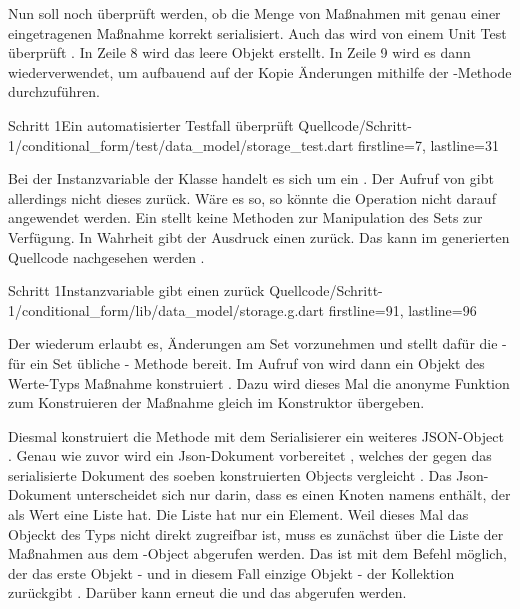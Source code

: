 Nun soll noch überprüft werden, ob die Menge von Maßnahmen mit genau einer eingetragenen Maßnahme korrekt serialisiert. Auch das wird von einem Unit Test überprüft \Lst{\ref{lst:Schritt1MaßnahmenSerialisierenOhneFehlerUnitTest}}. In Zeile 8 wird das leere Objekt  erstellt. In Zeile 9 wird es dann wiederverwendet, um aufbauend auf der Kopie Änderungen mithilfe der -Methode durchzuführen.

\begin{alexlisting}{Schritt 1}{Ein automatisierter Testfall überprüft}
  {Quellcode/Schritt-1/conditional_form/test/data_model/storage_test.dart}
  {firstline=7, lastline=31}
  \label{lst:Schritt1MaßnahmenSerialisierenOhneFehlerUnitTest}
\end{alexlisting}

Bei der Instanzvariable  der Klasse  handelt es sich um ein .  Der Aufruf von   gibt allerdings nicht dieses  zurück. Wäre es so, so könnte die Operation  nicht  darauf angewendet werden. Ein  stellt keine Methoden zur Manipulation des Sets zur Verfügung. In Wahrheit gibt der Ausdruck  einen  zurück. Das kann im generierten Quellcode nachgesehen werden \LstZ{\ref{lst:Schritt1InstanzvariableMassnahmenGibtEinenSetBuilderZurueck}}.

\begin{alexlisting}{Schritt 1}{Instanzvariable  gibt einen  zurück}
  {Quellcode/Schritt-1/conditional_form/lib/data_model/storage.g.dart}
  {firstline=91, lastline=96}
  \label{lst:Schritt1InstanzvariableMassnahmenGibtEinenSetBuilderZurueck}
\end{alexlisting}

Der  wiederum erlaubt es, Änderungen am Set vorzunehmen und stellt dafür die - für ein Set übliche - Methode  bereit. Im Aufruf von  wird dann ein Objekt des Werte-Typs Maßnahme konstruiert . Dazu wird dieses Mal die anonyme Funktion zum Konstruieren der Maßnahme gleich im Konstruktor übergeben.


Diesmal konstruiert die Methode  mit dem Serialisierer  ein weiteres JSON-Object . Genau wie zuvor wird ein Json-Dokument vorbereitet , welches der   gegen das serialisierte Dokument des soeben konstruierten Objects  vergleicht . Das Json-Dokument unterscheidet sich nur darin, dass es einen Knoten namens  enthält, der als Wert eine Liste hat. Die Liste hat nur ein Element.  Weil dieses Mal das Objeckt des Typs  nicht direkt zugreifbar ist, muss es zunächst über die Liste der Maßnahmen aus dem -Object abgerufen werden. Das ist mit dem Befehl  möglich, der das erste Objekt - und in diesem Fall einzige Objekt - der Kollektion zurückgibt . Darüber kann erneut die   und  das  abgerufen werden.

